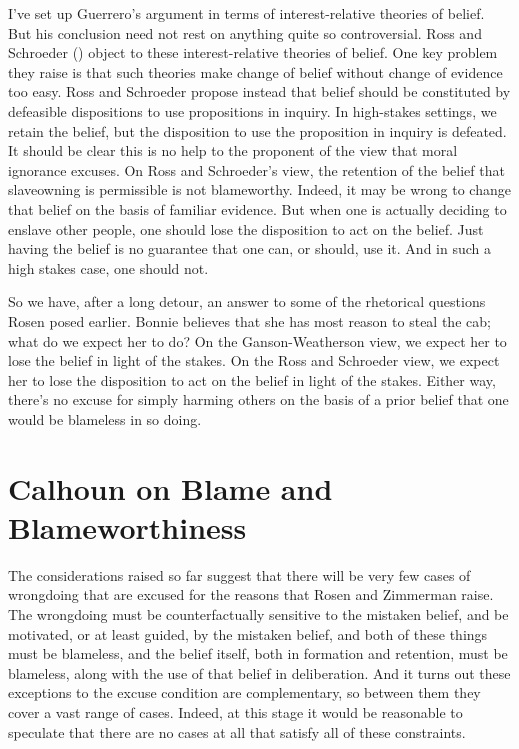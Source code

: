 \documentclass[
  10pt,
  letterpaper,
  twoside]{scrbook}
\begin{document}
I've set up Guerrero's argument in terms of interest-relative theories
of belief. But his conclusion need not rest on anything quite so
controversial. Ross and Schroeder
() object to these
interest-relative theories of belief. One key problem they raise is that
such theories make change of belief without change of evidence too easy.
Ross and Schroeder propose instead that belief should be constituted by
defeasible dispositions to use propositions in inquiry. In high-stakes
settings, we retain the belief, but the disposition to use the
proposition in inquiry is defeated. It should be clear this is no help
to the proponent of the view that moral ignorance excuses. On Ross and
Schroeder's view, the retention of the belief that slaveowning is
permissible is not blameworthy. Indeed, it may be wrong to change that
belief on the basis of familiar evidence. But when one is actually
deciding to enslave other people, one should lose the disposition to act
on the belief. Just having the belief is no guarantee that one can, or
should, use it. And in such a high stakes case, one should not.

So we have, after a long detour, an answer to some of the rhetorical
questions Rosen posed earlier. {Bonnie} believes that she has most
reason to steal the cab; what do we expect her to do? On the
Ganson-Weatherson view, we expect her to lose the belief in light of the
stakes. On the Ross and Schroeder view, we expect her to lose the
disposition to act on the belief in light of the stakes. Either way,
there's no excuse for simply harming others on the basis of a prior
belief that one would be blameless in so doing.

\section{Calhoun on Blame and
Blameworthiness}\label{calhounonblameandblameworthiness}

The considerations raised so far suggest that there will be very few
cases of wrongdoing that are excused for the reasons that Rosen and
Zimmerman raise. The wrongdoing must be counterfactually sensitive to
the mistaken belief, and be motivated, or at least guided, by the
mistaken belief, and both of these things must be blameless, and the
belief itself, both in formation and retention, must be blameless, along
with the use of that belief in deliberation. And it turns out these
exceptions to the excuse condition are complementary, so between them
they cover a vast range of cases. Indeed, at this stage it would be
reasonable to speculate that there are no cases at all that satisfy all
of these constraints.
\end{document}
